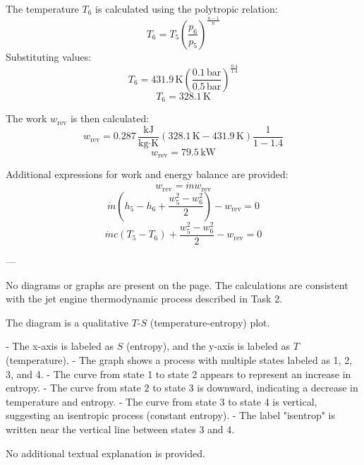 The temperature \( T_6 \) is calculated using the polytropic relation:
\[
T_6 = T_5 \left( \frac{p_6}{p_5} \right)^{\frac{n-1}{n}}
\]
Substituting values:
\[
T_6 = 431.9 \, \text{K} \left( \frac{0.1 \, \text{bar}}{0.5 \, \text{bar}} \right)^{\frac{0.4}{1.4}}
\]
\[
T_6 = 328.1 \, \text{K}
\]

The work \( w_{\text{rev}} \) is then calculated:
\[
w_{\text{rev}} = 0.287 \, \frac{\text{kJ}}{\text{kg·K}} \left( 328.1 \, \text{K} - 431.9 \, \text{K} \right) \frac{1}{1 - 1.4}
\]
\[
w_{\text{rev}} = 79.5 \, \text{kW}
\]

Additional expressions for work and energy balance are provided:
\[
w_{\text{rev}} = \dot{m} w_{\text{rev}}
\]
\[
\dot{m} \left( h_5 - h_6 + \frac{w_5^2 - w_6^2}{2} \right) - w_{\text{rev}} = 0
\]
\[
\dot{m} c (T_5 - T_6) + \frac{w_5^2 - w_6^2}{2} - w_{\text{rev}} = 0
\]

---

No diagrams or graphs are present on the page. The calculations are consistent with the jet engine thermodynamic process described in Task 2.

The diagram is a qualitative \( T \)-\( S \) (temperature-entropy) plot.  

- The x-axis is labeled as \( S \) (entropy), and the y-axis is labeled as \( T \) (temperature).  
- The graph shows a process with multiple states labeled as 1, 2, 3, and 4.  
- The curve from state 1 to state 2 appears to represent an increase in entropy.  
- The curve from state 2 to state 3 is downward, indicating a decrease in temperature and entropy.  
- The curve from state 3 to state 4 is vertical, suggesting an isentropic process (constant entropy).  
- The label "isentrop" is written near the vertical line between states 3 and 4.  

No additional textual explanation is provided.